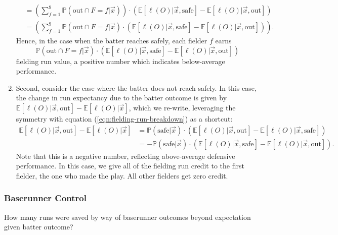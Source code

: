 \documentclass{article}
\begin{document}
\begin{enumerate}
\begin{align*}
                                                                                     &= \left(\sum_{f = 1}^9 \mathbb{P}(\mbox{out} \cap F = f | \vec x)\right) \cdot (\mathbb{E}[\ell(O) | \vec x, \mbox{safe}] - \mathbb{E}[\ell(O) | \vec x, \mbox{out}])\\
                                                                                     &= \left(\sum_{f = 1}^9 \mathbb{P}(\mbox{out} \cap F = f | \vec x) \cdot (\mathbb{E}[\ell(O) | \vec x, \mbox{safe}] - \mathbb{E}[\ell(O) | \vec x, \mbox{out}])\right).
          \end{align*}
          Hence, in the case when the batter reaches safely, each fielder $f$ earns
          $$\mathbb{P}(\mbox{out} \cap F = f | \vec x) \cdot (\mathbb{E}[\ell(O) | \vec x, \mbox{safe}] - \mathbb{E}[\ell(O) | \vec x, \mbox{out}])$$
          fielding run value, a positive number which indicates below-average performance.
        \item Second, consider the case where the batter does not reach safely. In this case, the change in run expectancy due to the batter outcome is given by $\mathbb{E}[\ell(O) | \vec x, \mbox{out}] - \mathbb{E}[\ell(O) | \vec x]$, which we re-write, leveraging the symmetry with equation (\ref{eqn:fielding-run-breakdown}) as a shortcut:
        \begin{align*}
          \mathbb{E}[\ell(O) | \vec x, \mbox{out}] - \mathbb{E}[\ell(O) | \vec x] &= \mathbb{P}(\mbox{safe} | \vec x) \cdot (\mathbb{E}[\ell(O) | \vec x, \mbox{out}] - \mathbb{E}[\ell(O) | \vec x, \mbox{safe}])\\
                                                                                  &= -\mathbb{P}(\mbox{safe} | \vec x) \cdot (\mathbb{E}[\ell(O) | \vec x, \mbox{safe}] - \mathbb{E}[\ell(O) | \vec x, \mbox{out}]).
        \end{align*}
        Note that this is a negative number, reflecting above-average defensive performance. In this case, we give all of the fielding run credit to the first fielder, the one who made the play. All other fielders get zero credit.
      \end{enumerate}

    \subsubsection{\sc Baserunner Control}
    \label{sec:baserunner-control}
      How many runs were saved by way of baserunner outcomes beyond expectation given batter outcome?
      
\end{document}
